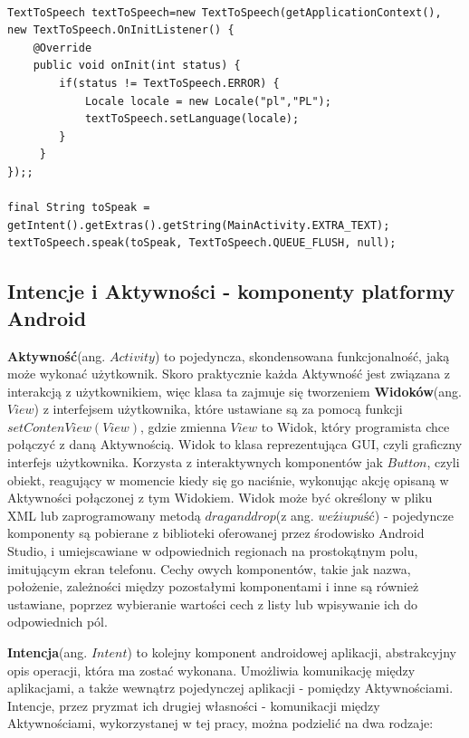 \documentclass[eng,oneside]{mgr}
\begin{document}
\begin{lstlisting}[caption={Kod programu, który odpowiada za przeczytanie tekstu z wykorzystaniem klasy TextToSpeech}]

TextToSpeech textToSpeech=new TextToSpeech(getApplicationContext(),
new TextToSpeech.OnInitListener() {
    @Override
    public void onInit(int status) {
        if(status != TextToSpeech.ERROR) {
            Locale locale = new Locale("pl","PL");
            textToSpeech.setLanguage(locale);
        }
     }
});;

final String toSpeak = getIntent().getExtras().getString(MainActivity.EXTRA_TEXT);
textToSpeech.speak(toSpeak, TextToSpeech.QUEUE_FLUSH, null);
\end{lstlisting}

\subsection{Intencje i Aktywności - komponenty platformy Android}
\textbf{Aktywność}(ang. $Activity$) to pojedyncza, skondensowana funkcjonalność, jaką może wykonać użytkownik. Skoro praktycznie każda Aktywność jest związana z interakcją z użytkownikiem, więc klasa ta zajmuje się tworzeniem \textbf{Widoków}(ang. $View$) z interfejsem użytkownika, które ustawiane są za pomocą funkcji $setContenView(View)$, gdzie zmienna $View$ to Widok, który programista chce połączyć z daną Aktywnością\cite{activity}. Widok to klasa reprezentująca GUI, czyli graficzny interfejs użytkownika. Korzysta z interaktywnych komponentów jak $Button$, czyli obiekt, reagujący w momencie kiedy się go naciśnie, wykonując akcję opisaną w Aktywności połączonej z tym Widokiem\cite{view}. Widok może być określony w pliku XML lub zaprogramowany metodą $drag and drop$(z ang. $weź i upuść$) - pojedyncze komponenty są pobierane z biblioteki oferowanej przez środowisko Android Studio, i umiejscawiane w odpowiednich regionach na prostokątnym polu, imitującym ekran telefonu. Cechy owych komponentów, takie jak nazwa, położenie, zależności między pozostałymi komponentami i inne są również ustawiane, poprzez wybieranie wartości cech z listy lub wpisywanie ich do odpowiednich pól.
\par \textbf{Intencja}(ang. $Intent$) to kolejny komponent androidowej aplikacji, abstrakcyjny opis operacji, która ma zostać wykonana\cite{intents}. Umożliwia komunikację między aplikacjami, a także wewnątrz pojedynczej aplikacji - pomiędzy Aktywnościami. Intencje, przez pryzmat ich drugiej własności - komunikacji między Aktywnościami, wykorzystanej w tej pracy, można podzielić na dwa rodzaje\cite{android4devs}:
\end{document}
